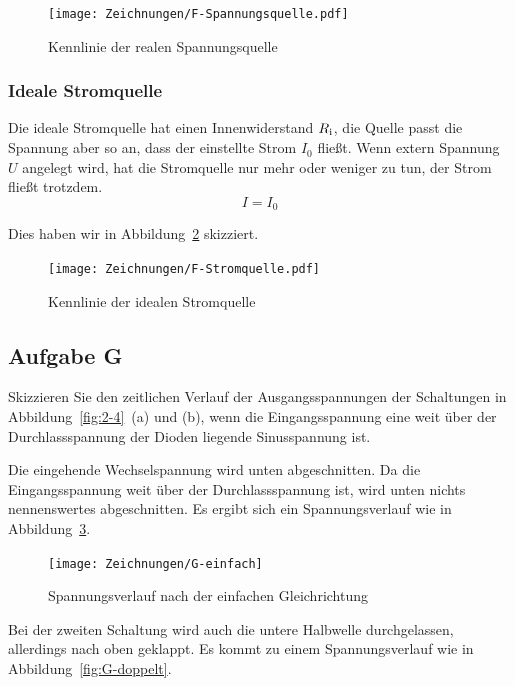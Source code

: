 \begin{figure}[h]
	\centering
	\caption{%
		Kennlinie der realen Spannungsquelle
	}
	\label{fig:F-Spannungsquelle}
	\texttt{[image: Zeichnungen/F-Spannungsquelle.pdf]}
\end{figure}

\subsubsection{Ideale Stromquelle}

Die ideale Stromquelle hat einen Innenwiderstand $R_\text i$, die Quelle passt
die Spannung aber so an, dass der einstellte Strom $I_0$ fließt. Wenn extern
Spannung $U$ angelegt wird, hat die Stromquelle nur mehr oder weniger zu tun,
der Strom fließt trotzdem.
\[
	I = I_0
\]

Dies haben wir in Abbildung~\ref{fig:F-Stromquelle} skizziert.

\begin{figure}[h]
	\centering
	\caption{%
		Kennlinie der idealen Stromquelle
	}
	\label{fig:F-Stromquelle}
	\texttt{[image: Zeichnungen/F-Stromquelle.pdf]}
\end{figure}

\subsection{Aufgabe G}

\begin{problem}
	Skizzieren Sie den zeitlichen Verlauf der Ausgangsspannungen der
	Schaltungen in Abbildung~\ref{fig:2-4}~(a) und (b), wenn die
	Eingangsspannung eine weit über der Durchlassspannung der Dioden liegende
	Sinusspannung ist.
\end{problem}

Die eingehende Wechselspannung wird unten abgeschnitten. Da die
Eingangsspannung weit über der Durchlassspannung ist, wird unten nichts
nennenswertes abgeschnitten. Es ergibt sich ein Spannungsverlauf wie in
Abbildung~\ref{fig:G-einfach}.

\begin{figure}[h]
	\centering
	\caption{%
		Spannungsverlauf nach der einfachen Gleichrichtung
	}
	\label{fig:G-einfach}
	\texttt{[image: Zeichnungen/G-einfach]}
\end{figure}

Bei der zweiten Schaltung wird auch die untere Halbwelle durchgelassen,
allerdings nach oben geklappt. Es kommt zu einem Spannungsverlauf wie in
Abbildung~\ref{fig:G-doppelt}.

